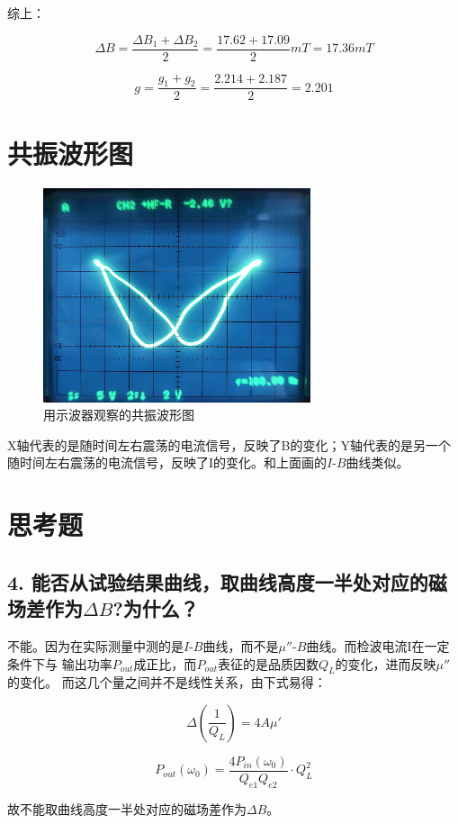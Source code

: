 \documentclass[a4paper,UTF8]{ctexart}
\begin{document}
综上：

\begin{equation}
    \Delta B = \frac{\Delta B_1 + \Delta B_2}{2} = \frac{17.62+17.09}{2} mT = 17.36 mT
\end{equation}

\begin{equation}
    g = \frac{g_1 + g_2}{2} = \frac{2.214+2.187}{2} = 2.201
\end{equation}

\section{共振波形图}

\begin{figure}[H]
    \centering
    \begin{minipage}[b]{0.9\textwidth}
        \centering
        \includegraphics[width=0.7\textwidth]{./fig1.png}
        \caption{用示波器观察的共振波形图}
    \end{minipage}
\end{figure}

X轴代表的是随时间左右震荡的电流信号，反映了B的变化；Y轴代表的是另一个随时间左右震荡的电流信号，反映了I的变化。和上面画的$I$-$B$曲线类似。

\section{思考题}

\subsection*{4. 能否从试验结果曲线，取曲线高度一半处对应的磁场差作为$\Delta B$?为什么？}

不能。因为在实际测量中测的是$I$-$B$曲线，而不是$\mu''$-$B$曲线。而检波电流I在一定条件下与
输出功率$P_{out}$成正比，而$P_{out}$表征的是品质因数$Q_L$的变化，进而反映$\mu''$的变化。
而这几个量之间并不是线性关系，由下式易得：

\begin{equation}
    \Delta (\frac{1}{Q_L}) = 4A\mu'
\end{equation}

\begin{equation}
    P_{out}(\omega_0)=\frac{4P_{in}(\omega_0)}{Q_{e1}Q_{e2}}\cdot Q_L^2
\end{equation}

故不能取曲线高度一半处对应的磁场差作为$\Delta B$。
\end{document}
